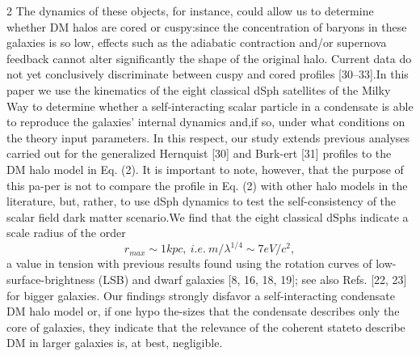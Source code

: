 \documentclass{article}
\begin{document}
\begin{multicols} {2}
The dynamics of these objects, for instance, could allow us to determine whether DM halos are cored or cuspy:since  the  concentration  of  baryons  in  these  galaxies  is so low, effects such as the adiabatic contraction and/or supernova feedback cannot alter significantly the shape of the original halo.  Current data do not yet conclusively discriminate between cuspy and cored profiles [30–33].In this paper we use the kinematics of the eight classical  dSph  satellites  of  the  Milky  Way  to  determine whether a self-interacting scalar particle in a condensate is able to reproduce the galaxies’ internal dynamics and,if so, under what conditions on the theory input parameters.  In this respect, our study extends previous analyses carried out for the generalized Hernquist [30] and Burk-ert [31] profiles to the DM halo model in Eq. (2).  It is important to note, however, that the purpose of this pa-per is not to compare the profile in Eq. (2) with other halo  models  in  the  literature,  but,  rather,  to  use  dSph dynamics  to  test  the  self-consistency  of  the  scalar  field dark matter scenario.We find that the eight classical dSphs indicate a scale radius of the order 
\begin{equation}
r_{max}\sim 1 kpc,~i.e.~{m/\lambda^{1/4}\sim {7eV/c^2}},
\end{equation}
a  value  in  tension  with  previous  results  found  using the rotation curves of low-surface-brightness (LSB) and dwarf galaxies [8, 16, 18, 19];  see also Refs. [22, 23] for bigger  galaxies.   Our  findings  strongly  disfavor  a self-interacting condensate DM halo model or, if one hypo the-sizes that the condensate describes only the core of galaxies, they indicate that the relevance of the coherent stateto describe DM in larger galaxies is, at best, negligible.


\end{multicols}
\end{document}
